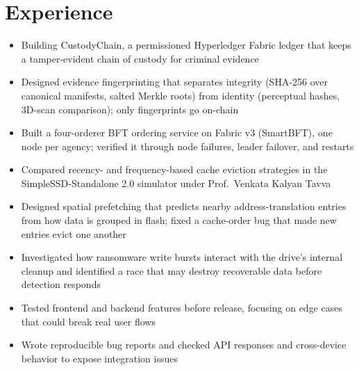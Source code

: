 \section{Experience}
\begin{itemize}
  \item Building CustodyChain, a permissioned Hyperledger Fabric ledger that keeps a tamper-evident chain of custody for criminal evidence
  \item Designed evidence fingerprinting that separates integrity (SHA-256 over canonical manifests, salted Merkle roots) from identity (perceptual hashes, 3D-scan comparison); only fingerprints go on-chain
  \item Built a four-orderer BFT ordering service on Fabric v3 (SmartBFT), one node per agency; verified it through node failures, leader failover, and restarts
\end{itemize}
\begin{itemize}
  \item Compared recency- and frequency-based cache eviction strategies in the SimpleSSD-Standalone 2.0 simulator under Prof.\ Venkata Kalyan Tavva
  \item Designed spatial prefetching that predicts nearby address-translation entries from how data is grouped in flash; fixed a cache-order bug that made new entries evict one another
  \item Investigated how ransomware write bursts interact with the drive's internal cleanup and identified a race that may destroy recoverable data before detection responds
\end{itemize}
\begin{itemize}
  \item Tested frontend and backend features before release, focusing on edge cases that could break real user flows
  \item Wrote reproducible bug reports and checked API responses and cross-device behavior to expose integration issues
\end{itemize}
